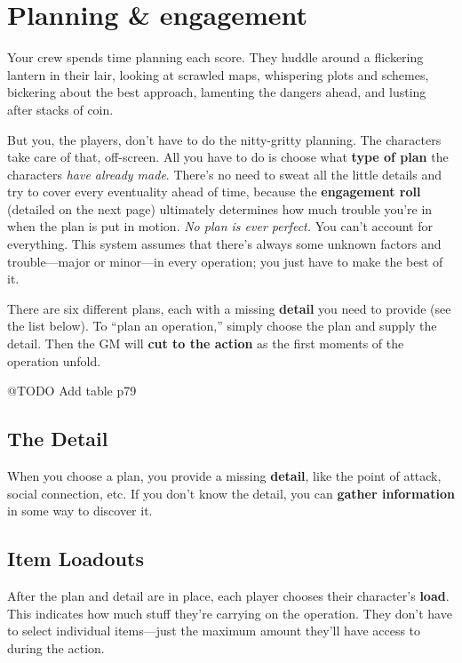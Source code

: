 \documentclass[11pt,oneside]{book}
\begin{document}
\chapter{Planning \& engagement}

Your crew spends time planning each score. They huddle around a flickering lantern in their lair, looking at scrawled maps, whispering plots and schemes, bickering about the best approach, lamenting the dangers ahead, and lusting after stacks of coin.

But you, the players, don’t have to do the nitty-gritty planning. The characters take care of that, off-screen. All you have to do is choose what \textbf{type of plan} the characters \emph{have already made}. There’s no need to sweat all the little details and try to cover every eventuality ahead of time, because the \textbf{engagement roll} (detailed on the next page) ultimately determines how much trouble you’re in when the plan is put in motion. \emph{No plan is ever perfect.} You can’t account for everything. This system assumes that there’s always some unknown factors and trouble---major or minor---in every operation; you just have to make the best of it.

There are six different plans, each with a missing \textbf{detail} you need to provide (see the list below). To “plan an operation,” simply choose the plan and supply the detail. Then the GM will \textbf{cut to the action} as the first moments of the operation unfold.

@TODO Add table p79

\section{The Detail}

When you choose a plan, you provide a missing \textbf{detail}, like the point of attack, social connection, etc. If you don’t know the detail, you can \textbf{gather information} in some way to discover it.

\section{Item Loadouts}

After the plan and detail are in place, each player chooses their character’s \textbf{load}. This indicates how much stuff they’re carrying on the operation. They don’t have to select individual items---just the maximum amount they’ll have access to during the action.
\end{document}
